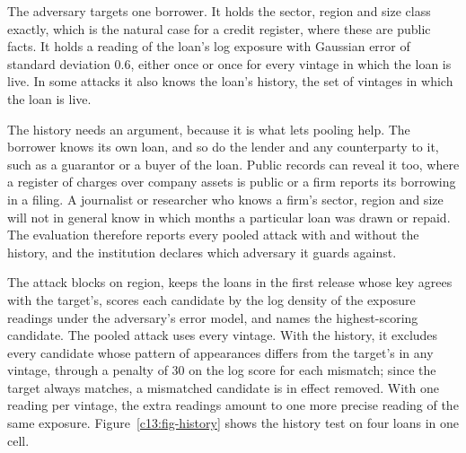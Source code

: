 The adversary targets one borrower. It holds the sector, region and size class
exactly, which is the natural case for a credit register, where these are
public facts. It holds a reading of the loan's log exposure with Gaussian error of
standard deviation 0.6, either once or once for every vintage in which the loan is
live. In some attacks it also knows the loan's history, the set of vintages in which
the loan is live.

The history needs an argument, because it is what lets pooling help. The borrower
knows its own loan, and so do the lender and any counterparty to it, such as a
guarantor or a buyer of the loan. Public records can reveal it too, where a register
of charges over company assets is public or a firm reports its borrowing in a filing.
A journalist or researcher who knows a firm's sector, region and size will not in
general know in which months a particular loan was drawn or repaid. The evaluation
therefore reports every pooled attack with and without the history, and the
institution declares which adversary it guards against.

The attack blocks on region, keeps the loans in the first release whose key agrees
with the target's, scores each candidate by the log density of the exposure readings
under the adversary's error model, and names the highest-scoring candidate. The
pooled attack uses every vintage. With the history, it excludes every candidate whose
pattern of appearances differs from the target's in any vintage, through a penalty of
30 on the log score for each mismatch; since the target always matches, a mismatched
candidate is in effect removed. With one reading per vintage, the extra readings
amount to one more precise reading of the same exposure.
Figure~\ref{c13:fig-history} shows the history test on four loans in one cell.

